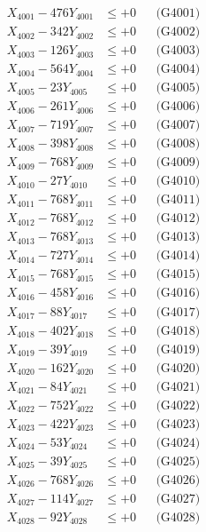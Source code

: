 \documentclass[a4paper,10pt]{article}
\begin{document}
{\begin{align}
\allowbreak
X_{4001} - 476Y_{4001} &\leq +0 && \text{(G4001)} \\
X_{4002} - 342Y_{4002} &\leq +0 && \text{(G4002)} \\
X_{4003} - 126Y_{4003} &\leq +0 && \text{(G4003)} \\
X_{4004} - 564Y_{4004} &\leq +0 && \text{(G4004)} \\
X_{4005} - 23Y_{4005} &\leq +0 && \text{(G4005)} \\
X_{4006} - 261Y_{4006} &\leq +0 && \text{(G4006)} \\
X_{4007} - 719Y_{4007} &\leq +0 && \text{(G4007)} \\
X_{4008} - 398Y_{4008} &\leq +0 && \text{(G4008)} \\
X_{4009} - 768Y_{4009} &\leq +0 && \text{(G4009)} \\
X_{4010} - 27Y_{4010} &\leq +0 && \text{(G4010)} \\
\allowbreak
X_{4011} - 768Y_{4011} &\leq +0 && \text{(G4011)} \\
X_{4012} - 768Y_{4012} &\leq +0 && \text{(G4012)} \\
X_{4013} - 768Y_{4013} &\leq +0 && \text{(G4013)} \\
X_{4014} - 727Y_{4014} &\leq +0 && \text{(G4014)} \\
X_{4015} - 768Y_{4015} &\leq +0 && \text{(G4015)} \\
X_{4016} - 458Y_{4016} &\leq +0 && \text{(G4016)} \\
X_{4017} - 88Y_{4017} &\leq +0 && \text{(G4017)} \\
X_{4018} - 402Y_{4018} &\leq +0 && \text{(G4018)} \\
X_{4019} - 39Y_{4019} &\leq +0 && \text{(G4019)} \\
X_{4020} - 162Y_{4020} &\leq +0 && \text{(G4020)} \\
\allowbreak
X_{4021} - 84Y_{4021} &\leq +0 && \text{(G4021)} \\
X_{4022} - 752Y_{4022} &\leq +0 && \text{(G4022)} \\
X_{4023} - 422Y_{4023} &\leq +0 && \text{(G4023)} \\
X_{4024} - 53Y_{4024} &\leq +0 && \text{(G4024)} \\
X_{4025} - 39Y_{4025} &\leq +0 && \text{(G4025)} \\
X_{4026} - 768Y_{4026} &\leq +0 && \text{(G4026)} \\
X_{4027} - 114Y_{4027} &\leq +0 && \text{(G4027)} \\
X_{4028} - 92Y_{4028} &\leq +0 && \text{(G4028)} \\

\end{align}}
\end{document}
